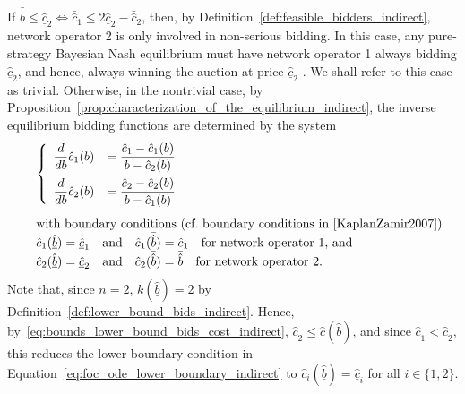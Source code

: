 If $\bar{\hat{b}} \leq \underline{\hat{c}}_2 \iff \bar{\hat{c}}_1 \le 2\underline{\hat{c}}_2 - \bar{\hat{c}}_2$, then, by Definition~\ref{def:feasible_bidders_indirect}, network operator 2 is only involved in non-serious bidding. In this case, any pure-strategy Bayesian Nash equilibrium must have network operator 1 always bidding $\underline{\hat{c}}_2$, and hence, always winning the auction at price $\underline{\hat{c}}_2$ \cite{KaplanZamir2007}. We shall refer to this case as trivial. Otherwise, in the nontrivial case, by Proposition~\ref{prop:characterization_of_the_equilibrium_indirect}, the inverse equilibrium bidding functions are determined by the system
\begin{equation}
  \label{eq:foc_restricted_indirect}
  \begin{array}{ll}
  &\left\{
  \begin{array}{ll}
    \displaystyle\frac{d}{db}\hat{c}_1(b) &= \displaystyle\frac{\bar{\hat{c}}_1 - \hat{c}_1(b)}{b - \hat{c}_2(b)} \\[2ex]
    \displaystyle\frac{d}{db}\hat{c}_2(b) &= \displaystyle\frac{\bar{\hat{c}}_2 - \hat{c}_2(b)}{b - \hat{c}_1(b)}
  \end{array}
  \right.\\[1cm]
  &\textrm{with boundary conditions (cf.~boundary conditions in~\cite{KaplanZamir2007})}\\
  &\hat{c}_1(\underline{\hat{b}}) = \underline{\hat{c}}_1 \quad\textrm{and}\quad \hat{c}_1(\bar{\hat{b}}) = \bar{\hat{c}}_1 \quad\textrm{for network operator 1, and}\\
  &\hat{c}_2(\underline{\hat{b}}) = \underline{\hat{c}}_2 \quad\textrm{and}\quad \hat{c}_2(\bar{\hat{b}}) = \bar{\hat{b}} \quad\textrm{for network operator 2.}
  \end{array}
\end{equation}
Note that, since $n=2$, $k(\underline{\hat{b}})=2$ by Definition~\ref{def:lower_bound_bids_indirect}. Hence, by~\eqref{eq:bounds_lower_bound_bids_cost_indirect}, $\underline{\hat{c}}_2\leq \hat{c}(\underline{\hat{b}})$, and since $\underline{\hat{c}}_1 < \underline{\hat{c}}_2$, this reduces the lower boundary condition in Equation~\eqref{eq:foc_ode_lower_boundary_indirect} to $\hat{c}_i(\underline{\hat{b}}) = \underline{\hat{c}}_i$ for all $i\in\{1,2\}$.

